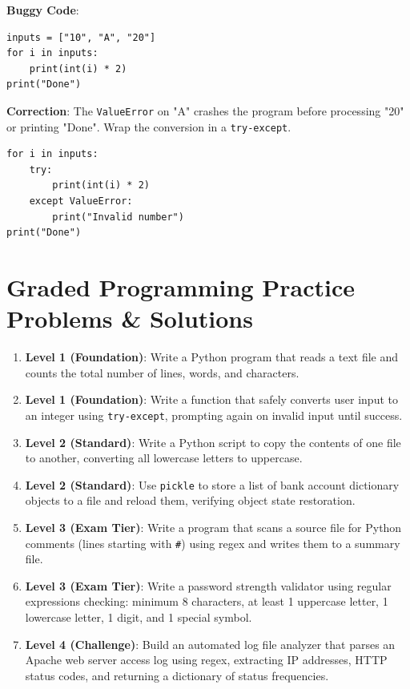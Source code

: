 \begin{debuggingbox}
\textbf{Buggy Code}:
\begin{lstlisting}[language=Python3]
inputs = ["10", "A", "20"]
for i in inputs:
    print(int(i) * 2)
print("Done")
\end{lstlisting}
\textbf{Correction}: The \texttt{ValueError} on "A" crashes the program before processing "20" or printing "Done". Wrap the conversion in a \texttt{try-except}.
\begin{lstlisting}[language=Python3]
for i in inputs:
    try:
        print(int(i) * 2)
    except ValueError:
        print("Invalid number")
print("Done")
\end{lstlisting}
\end{debuggingbox}


\section{Graded Programming Practice Problems \& Solutions}

\begin{practiceset}
\begin{enumerate}[leftmargin=1.5em]
    \item \textbf{Level 1 (Foundation)}: Write a Python program that reads a text file and counts the total number of lines, words, and characters.
    \item \textbf{Level 1 (Foundation)}: Write a function that safely converts user input to an integer using \texttt{try-except}, prompting again on invalid input until success.
    \item \textbf{Level 2 (Standard)}: Write a Python script to copy the contents of one file to another, converting all lowercase letters to uppercase.
    \item \textbf{Level 2 (Standard)}: Use \texttt{pickle} to store a list of bank account dictionary objects to a file and reload them, verifying object state restoration.
    \item \textbf{Level 3 (Exam Tier)}: Write a program that scans a source file for Python comments (lines starting with \texttt{\#}) using regex and writes them to a summary file.
    \item \textbf{Level 3 (Exam Tier)}: Write a password strength validator using regular expressions checking: minimum 8 characters, at least 1 uppercase letter, 1 lowercase letter, 1 digit, and 1 special symbol.
    \item \textbf{Level 4 (Challenge)}: Build an automated log file analyzer that parses an Apache web server access log using regex, extracting IP addresses, HTTP status codes, and returning a dictionary of status frequencies.
\end{enumerate}
\end{practiceset}


